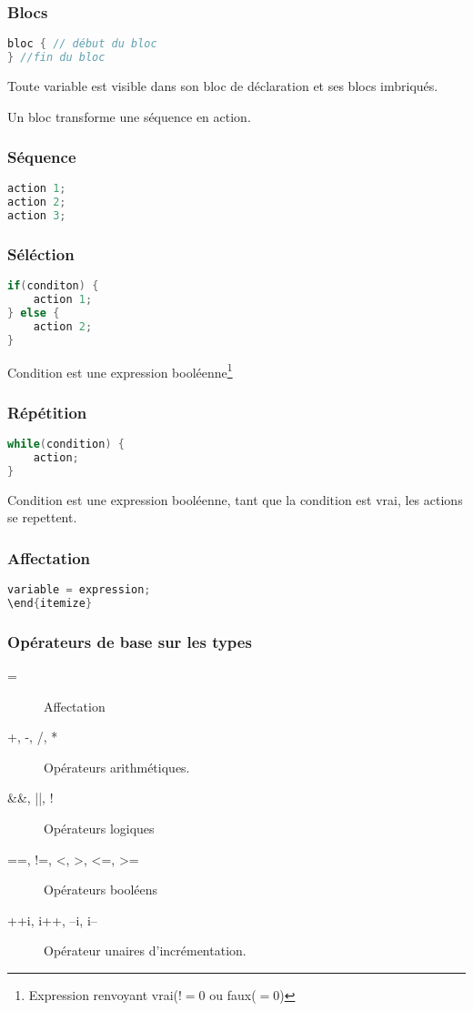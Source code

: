 \documentclass[12pt,a4paper,openany]{article}
\begin{document}
	\subsubsection{Blocs}
\begin{lstlisting}[language=C, caption=Syntaxe de déclaration de variable]
bloc { // début du bloc
} //fin du bloc
\end{lstlisting}
	Toute variable est visible dans son bloc de déclaration et ses blocs imbriqués.

	Un bloc transforme une séquence en action.

	\subsubsection{Séquence}
\begin{lstlisting}[language=C, caption=Syntaxe de déclaration de variable]
action 1;
action 2;
action 3;
\end{lstlisting}
	\subsubsection{Séléction}
\begin{lstlisting}[language=C, caption=Syntaxe de déclaration de variable]
if(conditon) {
	action 1;
} else {
	action 2;
}
\end{lstlisting}
Condition est une expression booléenne\footnote{Expression renvoyant vrai($!= 0$ ou faux($=0$)} %

\subsubsection{Répétition}
\begin{lstlisting}[language=C, caption=Syntaxe de déclaration de variable]
while(condition) {
	action;
}
\end{lstlisting}
Condition est une expression booléenne, tant que la condition est vrai, les actions se repettent.

\subsubsection{Affectation}
\begin{lstlisting}[language=C, caption=Syntaxe de déclaration de variable]
variable = expression;
\end{itemize}
\end{lstlisting}
\subsubsection{Opérateurs de base sur les types}
\begin{description}
	\item[=] Affectation
	\item[+, -, /, *] Opérateurs arithmétiques.
	\item[\&\&, ||, !] Opérateurs logiques 
	\item[==, !=, <, >, <=, >=] Opérateurs booléens
	\item[++i, i++, --i, i--] Opérateur unaires d'incrémentation.
\end{description}
\end{document}
